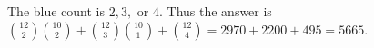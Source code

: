 The blue count is $2,3,$ or $4$. Thus the answer is $\binom{12}{2}\binom{10}{2}+\binom{12}{3}\binom{10}{1}+\binom{12}{4}=2970+2200+495=\boxed{5665}$.
